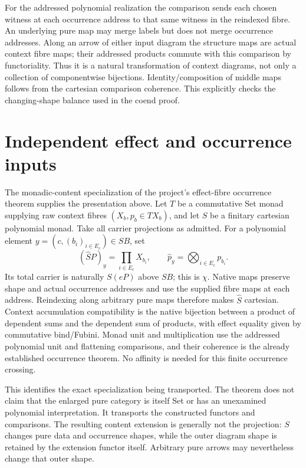 \documentclass[11pt]{article}
\begin{document}
For the addressed polynomial realization the comparison sends each chosen witness at each occurrence address to that same witness in the reindexed fibre. An underlying pure map may merge labels but does not merge occurrence addresses. Along an arrow of either input diagram the structure maps are actual context fibre maps; their addressed products commute with this comparison by functoriality. Thus it is a natural transformation of context diagrams, not only a collection of componentwise bijections. Identity/composition of middle maps follows from the cartesian comparison coherence. This explicitly checks the changing-shape balance used in the coend proof.

\section{Independent effect and occurrence inputs}
The monadic-content specialization of the project's effect-fibre occurrence theorem supplies the presentation above. Let $T$ be a commutative Set monad supplying raw context fibres $(X_b,p_b\in TX_b)$, and let $S$ be a finitary cartesian polynomial monad. Take all carrier projections as admitted. For a polynomial element $y=(c,(b_i)_{i\in E_c})\in SB$, set
\[
 (\widehat SP)_y=\prod_{i\in E_c}X_{b_i},\qquad
 \widehat p_y=\mathop{\bigotimes}_{i\in E_c}p_{b_i}.
\]
Its total carrier is naturally $S(eP)$ above $SB$; this is $\chi$. Native maps preserve shape and actual occurrence addresses and use the supplied fibre maps at each address. Reindexing along arbitrary pure maps therefore makes $\widehat S$ cartesian. Context accumulation compatibility is the native bijection between a product of dependent sums and the dependent sum of products, with effect equality given by commutative bind/Fubini. Monad unit and multiplication use the addressed polynomial unit and flattening comparisons, and their coherence is the already established occurrence theorem. No affinity is needed for this finite occurrence crossing.

This identifies the exact specialization being transported. The theorem does not claim that the enlarged pure category is itself Set or has an unexamined polynomial interpretation. It transports the constructed functors and comparisons. The resulting content extension is generally not the projection: $S$ changes pure data and occurrence shapes, while the outer diagram shape is retained by the extension functor itself. Arbitrary pure arrows may nevertheless change that outer shape.
\end{document}

